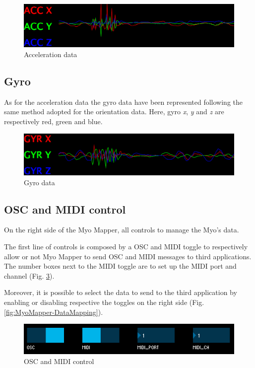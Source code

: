 \documentclass[12pt,a4paper]{article}
\begin{document}
		\begin{figure}[h]
			\centering
			\includegraphics[width=0.6\linewidth]{../MyoMapper-Acc}
			\caption{Acceleration data}
			\label{fig:MyoMapper-Acc}
		\end{figure}	
		
		\subsection{Gyro}
		As for the acceleration data the gyro data have been represented following the same method adopted for the orientation data. Here, gyro \textit{x}, \textit{y} and \textit{z} are respectively red, green and blue.
		
		\begin{figure}[h]
			\centering
			\includegraphics[width=0.6\linewidth]{../MyoMapper-Gyro}
			\caption{Gyro data}
			\label{fig:MyoMapper-Gyro}
		\end{figure}	
		
		\subsection{OSC and MIDI control}

		On the right side of the Myo Mapper, all controls to manage the Myo's data.
		
		The first line of controls is composed by a OSC and MIDI toggle to respectively allow or not Myo Mapper to send OSC and MIDI messages to third applications. The number boxes next to the MIDI toggle are to set up the MIDI port and channel (Fig. \ref{fig:MyoMapper-OSC-MIDI}).

		Moreover, it is possible to select the data to send to the third application by enabling or disabling respective the toggles on the right side (Fig. \ref{fig:MyoMapper-DataMapping}).
		
		\begin{figure}[h]
			\centering
			\includegraphics[width=0.6\linewidth]{../MyoMapper-OSC-MIDI}
			\caption{OSC and MIDI control}
			\label{fig:MyoMapper-OSC-MIDI}
		\end{figure}
		
\end{document}
